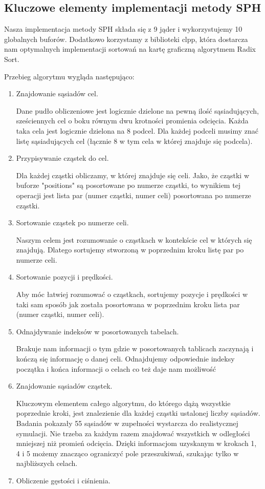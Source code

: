 \documentclass[polish, 12pt]{aghthesis}
\begin{document}
	\subsection{Kluczowe elementy implementacji metody SPH}
		
		Nasza implementacja metody SPH składa się z 9 jąder i wykorzystujemy 10 globalnych buforów. Dodatkowo korzystamy z biblioteki clpp, która dostarcza nam optymalnych implementacji sortowań na kartę graficzną algorytmem Radix Sort.
		
		\noindent Przebieg algorytmu wygląda następująco:
			\begin{enumerate}
			\item{Znajdowanie sąsiadów cel}.
			
				Dane pudło obliczeniowe jest logicznie dzielone na pewną ilość sąsiadujących, sześciennych cel o boku równym dwu krotności promienia odcięcia. Każda taka cela jest logicznie dzielona na 8 podcel. Dla każdej podceli musimy znać listę sąsiadujących cel (łącznie 8 w tym cela w której znajduje się podcela).
			\item{Przypisywanie cząstek do cel}.
			
				Dla każdej cząstki obliczamy, w której znajduje się celi. Jako, że cząstki w buforze "positions" są posortowane po numerze cząstki, to wynikiem tej operacji jest lista par (numer cząstki, numer celi) posortowana po numerze cząstki.
			\item{Sortowanie cząstek po numerze celi}.
			
				Naszym celem jest rozumowanie o cząstkach w kontekście cel w których się znajdują. Dlatego sortujemy stworzoną w poprzednim kroku listę par po numerze celi.
			\item{Sortowanie pozycji i prędkości}.
			
				Aby móc łatwiej rozumować o cząstkach, sortujemy pozycje i prędkości w taki sam sposób jak została posortowana w poprzednim kroku lista par (numer cząstki, numer celi).
			\item{Odnajdywanie indeksów w posortowanych tabelach}.
			
				Brakuje nam informacji o tym gdzie w posortowanych tablicach zaczynają i kończą się informację o danej celi. Odnajdujemy odpowiednie indeksy początka i końca informacji o celach co też daje nam możliwość
				
			\item{Znajdowanie sąsiadów cząstek}.
			
				Kluczowym elementem całego algorytmu, do którego dążą wszystkie poprzednie kroki, jest znalezienie dla każdej cząstki ustalonej liczby sąsiadów. Badania pokazały 55 sąsiadów w zupełności wystarcza do realistycznej symulacji. Nie trzeba za każdym razem znajdować wszystkich w odległości mniejszej niż promień odcięcia. Dzięki informacjom uzyskanym w krokach 1, 4 i 5 możemy znacząco ograniczyć pole przeszukiwań, szukając tylko w najbliższych celach.
			\item{Obliczenie gęstości i ciśnienia}.
			

\end{enumerate}
\end{document}
